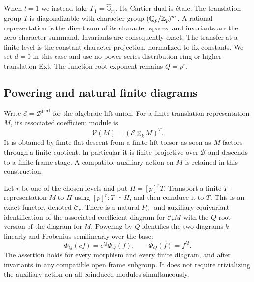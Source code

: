 When $t=1$ we instead take $\Gamma_1=\widehat{\mathbb G}_m$.
Its Cartier dual is \'etale.  The translation group $T$ is
diagonalizable with character group
$(\mathbb Q_p/\mathbb Z_p)^m$.  A rational representation is the direct
sum of its character spaces, and invariants are the
zero-character summand.  Invariants are consequently
exact.  The transfer at a finite level is the
constant-character projection, normalized to fix constants.
We set $d=0$ in this case and use no power-series
distribution ring or higher translation Ext.  The
function-root exponent remains $Q=p^r$.

\subsection{Powering and natural finite diagrams}

Write $\mathcal E=\mathcal B^{\mathrm{perf}}$ for the
algebraic lift union.  For a finite translation
representation $M$, its associated coefficient module is
\[
 \mathcal V(M)=(\mathcal E\otimes_k M)^T.
\]
It is obtained by finite flat descent from a finite lift
torsor as soon as $M$ factors through a finite quotient.
In particular it is finite projective over $\mathcal B$
and descends to a finite frame stage.  A compatible
auxiliary action on $M$ is retained in this construction.

\begin{lemma}\label{rings:coinduction}
Let $r$ be one of the chosen levels and put $H=[p]^rT$.
Transport a finite $T$-representation $M$ to $H$ using
$[p]^r:T\simeq H$, and then coinduce it to $T$.  This is
an exact functor, denoted $\mathcal C_r$.
There is a natural $P_n$- and auxiliary-equivariant
identification of the associated coefficient diagram for
$\mathcal C_rM$ with the $Q$-root version of the diagram
for $M$.  Powering by $Q$ identifies the two diagrams
$k$-linearly and Frobenius-semilinearly over the base:
\begin{equation}\label{rings:power-scalar-rule}
 \Phi_Q(cf)=c^Q\Phi_Q(f),\qquad \Phi_Q(f)=f^Q.
\end{equation}
The assertion holds for every morphism and every finite
diagram, and after invariants in any compatible open
frame subgroup.  It does not require trivializing the
auxiliary action on all coinduced modules simultaneously.
\end{lemma}

